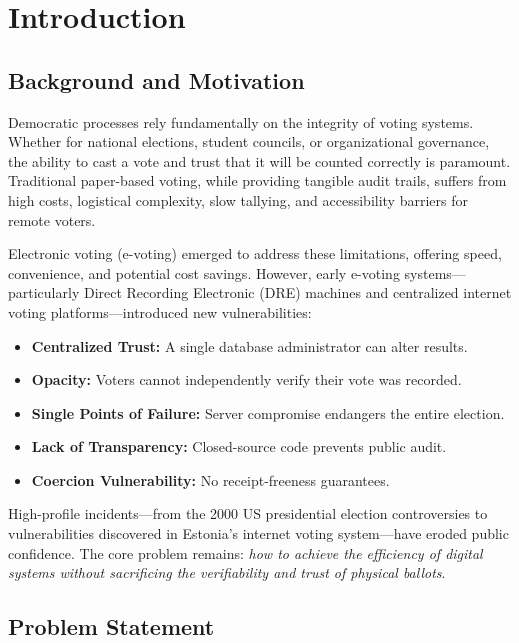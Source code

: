\chapter{Introduction}
\label{ch:introduction}

\section{Background and Motivation}
\label{sec:background}

Democratic processes rely fundamentally on the integrity of voting systems. Whether for
national elections, student councils, or organizational governance, the ability to
cast a vote and trust that it will be counted correctly is paramount. Traditional
paper-based voting, while providing tangible audit trails, suffers from high costs,
logistical complexity, slow tallying, and accessibility barriers for remote voters.

Electronic voting (e-voting) emerged to address these limitations, offering speed,
convenience, and potential cost savings. However, early e-voting systems—particularly
Direct Recording Electronic (DRE) machines and centralized internet voting
platforms—introduced new vulnerabilities:
\begin{itemize}
    \item \textbf{Centralized Trust:} A single database administrator can alter results.
    \item \textbf{Opacity:} Voters cannot independently verify their vote was recorded.
    \item \textbf{Single Points of Failure:} Server compromise endangers the entire election.
    \item \textbf{Lack of Transparency:} Closed-source code prevents public audit.
    \item \textbf{Coercion Vulnerability:} No receipt-freeness guarantees.
\end{itemize}

High-profile incidents—from the 2000 US presidential election controversies to
vulnerabilities discovered in Estonia's internet voting system—have eroded public
confidence. The core problem remains: \textit{how to achieve the efficiency of digital
systems without sacrificing the verifiability and trust of physical ballots}.

\section{Problem Statement}
\label{sec:problem}

